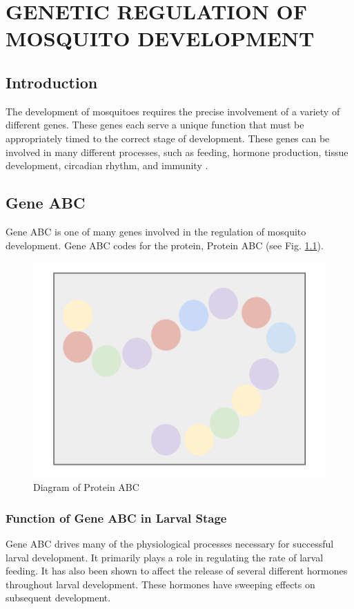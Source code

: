 \chapter{GENETIC REGULATION OF MOSQUITO DEVELOPMENT}
\section{Introduction}

The development of mosquitoes requires the precise involvement of a variety of different genes. These genes each serve a unique function that must be appropriately timed to the correct stage of development. These genes can be involved in many different processes, such as feeding, hormone production, tissue development, circadian rhythm, and immunity \citep{smith2004}. 

\section{Gene ABC}

Gene ABC is one of many genes involved in the regulation of mosquito development. Gene ABC codes for the protein, Protein ABC (see Fig. \ref{fig:protein}). 

\begin{figure}[b!]
	\centering
	\includegraphics[width=0.8\linewidth]{Images/protein.png}
	\caption{Diagram of Protein ABC}
        \label{fig:protein}
\end{figure}


\subsection{Function of Gene ABC in Larval Stage}

Gene ABC drives many of the physiological processes necessary for successful larval development. It primarily plays a role in regulating the rate of larval feeding. It has also been shown to affect the release of several different hormones throughout larval development. These hormones have sweeping effects on subsequent development.

